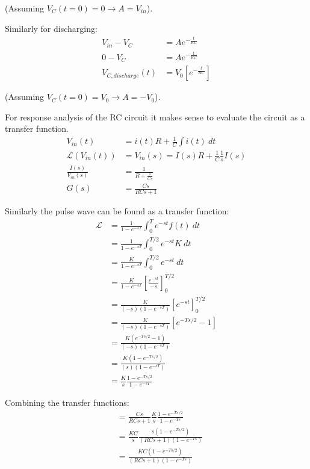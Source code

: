 \documentclass[11pt]{article}
\begin{document}
(Assuming $V_C(t=0)=0 \to A=V_{in}$).

Similarly for discharging:
\begin{subequations}
  \begin{align}
    V_{in} - V_C &= Ae^{-\frac{t}{RC}} \\
    0 - V_C &= Ae^{-\frac{t}{RC}} \\
    V_{C,discharge}(t) &= V_0\left[e^{-\frac{t}{RC}}\right]
  \end{align}
\end{subequations}

(Assuming $V_C(t=0)=V_0 \to A=-V_0$).

For response analysis of the RC circuit it makes sense to evaluate the circuit as a transfer function.
\begin{subequations}
  \begin{align}
    V_{in}(t) &= i(t) R + \frac{1}{C} \int i(t)~dt \\
    \mathcal{L}(V_{in}(t)) &= V_{in}(s) = I(s) R + \frac{1}{C}\frac{1}{s} I(s) \\
    \frac{I(s)}{V_{in}(s)} &= \frac{1}{R+\frac{1}{Cs}} \\
    G(s) &= \frac{Cs}{RCs + 1}
  \end{align}
\end{subequations}

Similarly the pulse wave can be found as a transfer function:
\begin{subequations}
  \begin{align}
    \mathcal{L} &= \frac{1}{1-e^{-sT}} \int_0^T e^{-st} f(t)~dt \\
    &= \frac{1}{1-e^{-sT}} \int_0^{T/2} e^{-st} K~dt \\
    &= \frac{K}{1-e^{-sT}} \int_0^{T/2} e^{-st}~dt \\
    &= \frac{K}{1-e^{-sT}} \left[\frac{e^{-st}}{-s}\right]_0^{T/2} \\
    &= \frac{K}{(-s)(1-e^{-sT})} \left[e^{-st}\right]_0^{T/2} \\
    &= \frac{K}{(-s)(1-e^{-sT})} \left[e^{-Ts/2} - 1\right] \\
    &= \frac{K(e^{-Ts/2}-1)}{(-s)(1-e^{-sT})} \\
    &= \frac{K(1-e^{-Ts/2})}{(s)(1-e^{-sT})} \\
    &= \frac{K}{s}\frac{1-e^{-Ts/2}}{1-e^{-sT}}
  \end{align}
\end{subequations}

Combining the transfer functions:
\begin{subequations}
  \begin{align}
    &= \frac{Cs}{RCs + 1} \frac{K}{s} \frac{1-e^{-Ts/2}}{1-e^{-Ts}} \\
    &= \frac{KC}{s} \frac{s(1-e^{-Ts/2})}{(RCs + 1)(1-e^{-Ts})} \\
    &= \frac{KC(1-e^{-Ts/2})}{(RCs + 1)(1-e^{-Ts})}
  \end{align}
\end{subequations}
\end{document}

